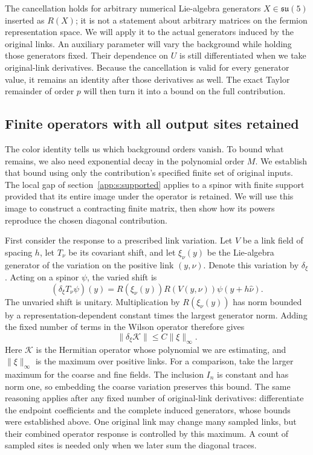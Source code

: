 \documentclass[11pt,a4paper]{article}
\theoremstyle{remark}
\begin{document}
The cancellation holds for arbitrary numerical Lie-algebra generators
$X\in\mathfrak{su}(5)$ inserted as $R(X)$; it is not a statement
about arbitrary matrices on the fermion representation space. We will
apply it to the actual generators induced by the original links. An
auxiliary parameter will vary the background while holding those
generators fixed. Their dependence on $U$ is still differentiated
when we take original-link derivatives. Because the cancellation is
valid for every generator value, it remains an identity after those
derivatives as well. The exact Taylor remainder of order $p$ will
then turn it into a bound on the full contribution.

\subsection{Finite operators with all output sites retained}

The color identity tells us which background orders vanish. To bound
what remains, we also need exponential decay in the polynomial order
$M$. We establish that bound using only the contribution's specified
finite set of original inputs. The local gap of
section~\ref{app:s:supported} applies to a spinor with finite support
provided that its entire image under the operator is retained. We will
use this image to construct a contracting finite matrix, then show how
its powers reproduce the chosen diagonal contribution.

First consider the response to a prescribed link variation. Let $V$
be a link field of spacing $h$, let $T_\nu$ be its covariant shift,
and let $\xi_\nu(y)$ be the Lie-algebra generator of the variation
on the positive link $(y,\nu)$. Denote this variation by $\delta_\xi$.
Acting on a spinor $\psi$, the varied shift is
\begin{equation}
 (\delta_\xi T_\nu\psi)(y)
   =R(\xi_\nu(y))R(V(y,\nu))\psi(y+h\hat\nu).
\end{equation}
The unvaried shift is unitary. Multiplication by $R(\xi_\nu(y))$
has norm bounded by a representation-dependent constant times the
largest generator norm. Adding the fixed number of terms in the Wilson
operator therefore gives
\begin{equation}
 \|\delta_\xi\mathcal K\|\le C\|\xi\|_\infty.
 \label{app:a:operator-derivatives}
\end{equation}
Here $\mathcal K$ is the Hermitian operator whose polynomial we are
estimating, and $\|\xi\|_\infty$ is the maximum over positive links.
For a comparison, take the larger maximum for the coarse and fine
fields. The inclusion $I_n$ is constant and has norm one, so embedding
the coarse variation preserves this bound. The same reasoning applies
after any fixed number of original-link derivatives: differentiate the
endpoint coefficients and the complete induced generators, whose
bounds were established above. One original link may change many
sampled links, but their combined operator response is controlled by
this maximum. A count of sampled sites is needed only when we later
sum the diagonal traces.
\end{document}
